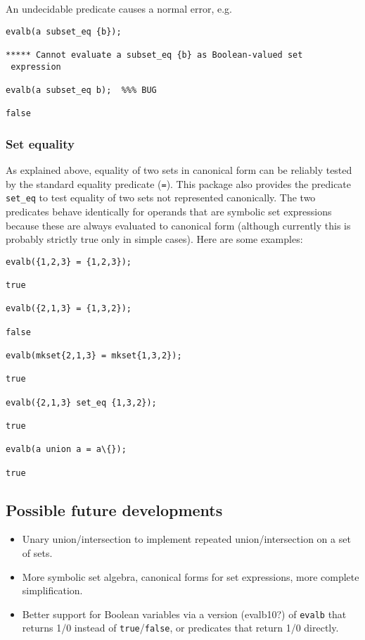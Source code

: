 An undecidable predicate causes a normal \REDUCE error, e.g.
\begin{verbatim}
evalb(a subset_eq {b});

***** Cannot evaluate a subset_eq {b} as Boolean-valued set
 expression

evalb(a subset_eq b);  %%% BUG

false
\end{verbatim}


\subsubsection{Set equality}
\hypertarget{operator:SET_EQ}{}

As explained above, equality of two sets in canonical form can be
reliably tested by the standard \REDUCE equality predicate (\texttt{=}).
This package also provides the predicate \texttt{set\_eq} to test
equality of two sets not represented canonically.  The two predicates
behave identically for operands that are symbolic set expressions
because these are always evaluated to canonical form (although
currently this is probably strictly true only in simple cases).  Here
are some examples:
\begin{verbatim}
evalb({1,2,3} = {1,2,3});

true

evalb({2,1,3} = {1,3,2});

false

evalb(mkset{2,1,3} = mkset{1,3,2});

true

evalb({2,1,3} set_eq {1,3,2});

true

evalb(a union a = a\{});

true
\end{verbatim}


\subsection{Possible future developments}

\begin{itemize}
\item Unary union/intersection to implement repeated
  union/intersection on a set of sets.
\item More symbolic set algebra, canonical forms for set expressions,
  more complete simplification.
\item Better support for Boolean variables via a version (evalb10?)
  of \texttt{evalb} that returns 1/0 instead of \texttt{true}/\texttt{false},
  or predicates that return 1/0 directly.
\end{itemize}
